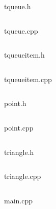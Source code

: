 \documentclass[12pt]{article}
\begin{document}
{\Huge tqueue.h}
\inputminted{C++}{tqueue.h}
    \pagebreak

{\Huge tqueue.cpp}
\inputminted{C++}{tqueue.cpp}
\pagebreak

{\Huge tqueueitem.h}
\inputminted{C++}{tqueueitem.h}
\pagebreak

{\Huge tqueueitem.cpp}
\inputminted{C++}{tqueueitem.cpp}
\pagebreak
    
{\Huge point.h}
\inputminted{C++}{point.h}
    \pagebreak

{\Huge point.cpp}
\inputminted{C++}{point.cpp}
    \pagebreak

{\Huge triangle.h}
\inputminted{C++}{triangle.h}
\pagebreak

{\Huge triangle.cpp}
\inputminted{C++}{triangle.cpp}
\pagebreak
    
{\Huge main.cpp}
\inputminted{C++}{main.cpp}
    \pagebreak
    
\end{document}
